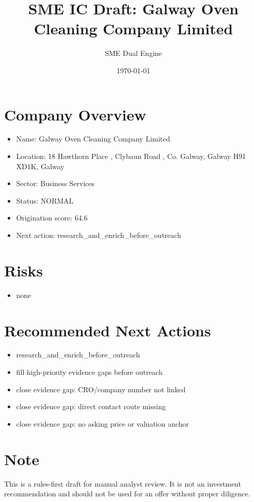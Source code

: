 \documentclass[11pt,a4paper]{article}
\title{SME IC Draft: Galway Oven Cleaning Company Limited}
\author{SME Dual Engine}
\date{\today}
\begin{document}
\maketitle
\section*{Company Overview}
\begin{itemize}[leftmargin=1.4em]
\item Name: Galway Oven Cleaning Company Limited
\item Location: 18 Hawthorn Place , Clybaun Road , Co. Galway, Galway H91 XD1K, Galway
\item Sector: Business Services
\item Status: NORMAL
\item Origination score: 64.6
\item Next action: research\_and\_enrich\_before\_outreach
\end{itemize}
\section*{Risks}
\begin{itemize}[leftmargin=1.4em]
\item none
\end{itemize}
\section*{Recommended Next Actions}
\begin{itemize}[leftmargin=1.4em]
\item research\_and\_enrich\_before\_outreach
\item fill high-priority evidence gaps before outreach
\item close evidence gap: CRO/company number not linked
\item close evidence gap: direct contact route missing
\item close evidence gap: no asking price or valuation anchor
\end{itemize}
\section*{Note}
This is a rules-first draft for manual analyst review. It is not an investment
recommendation and should not be used for an offer without proper diligence.
\end{document}
